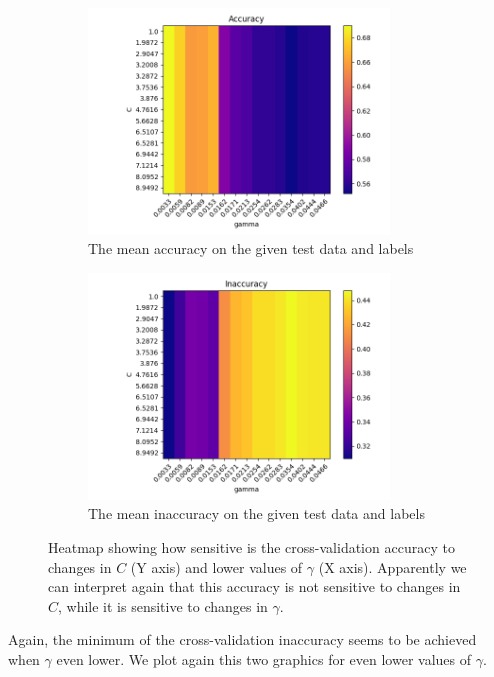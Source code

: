 \documentclass[12pt,letterpaper]{article}
\begin{document}
\begin{figure}[H]
    \begin{subfigure}{0.5\textwidth}
    \includegraphics[width=8cm]{images/accuracy_2.jpg} 
    \caption{The mean accuracy on the given test data and labels}
    \label{fig:subfig3}
    \end{subfigure}
    \begin{subfigure}{0.5\textwidth}
    \includegraphics[width=8cm]{images/inaccuracy_2.jpg}
    \caption{The mean inaccuracy on the given test data and labels}
    \label{fig:subfiig4}
    \end{subfigure}
    \caption{Heatmap showing how sensitive is the cross-validation accuracy to changes in $C$ (Y axis) and  lower values of $\gamma$ (X axis). Apparently we can interpret again that this accuracy is not sensitive to changes in $C$, while it is sensitive to changes in $\gamma$.}
\end{figure}

Again, the minimum of the cross-validation inaccuracy seems to be achieved when $\gamma$ even lower. We plot again this two graphics for even lower values of $\gamma$.
\end{document}
